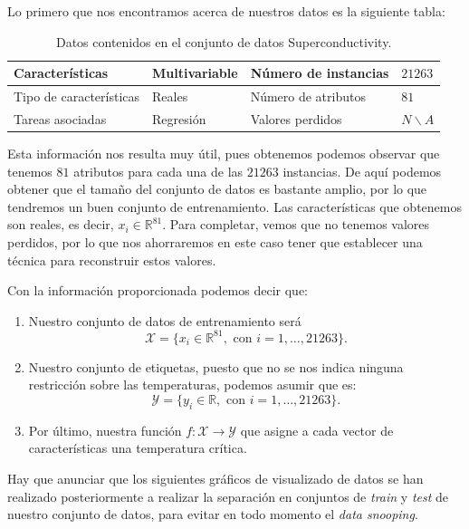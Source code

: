 \documentclass[a4paper, 20pt]{article}
\newcommand{\R}{\mathbb R}
\begin{document}
Lo primero que nos encontramos acerca de nuestros datos es la siguiente tabla:
\begin{table}[h]
  \centering
  \begin{tabular}{|l|l|l|l|}
    \hline
    Características         & Multivariable & Número de instancias & $21263$ \\ \hline
    Tipo de características & Reales        & Número de atributos  & $81$    \\ \hline
    Tareas asociadas        & Regresión     & Valores perdidos     & $N\backslash A$   \\ \hline
  \end{tabular}
  \caption{Datos contenidos en el conjunto de datos Superconductivity.}
\end{table}


Esta información nos resulta muy útil, pues obtenemos podemos observar que tenemos $81$ atributos para cada una de las $21263$ instancias. De aquí podemos obtener que el tamaño del conjunto de datos es bastante amplio, por lo que tendremos un buen conjunto de entrenamiento. Las características que obtenemos son reales, es decir, $x_i \in \mathbb R^{81}$. Para completar, vemos que no tenemos valores perdidos, por lo que nos ahorraremos en este caso tener que establecer una técnica para reconstruir estos valores.

Con la información proporcionada podemos decir que:

\begin{enumerate}
\item Nuestro conjunto de datos de entrenamiento será
  $$\mathcal X = \{ x_i \in \R^{81}, \text{ con } i = 1, \dots , 21263 \}.$$

\item Nuestro conjunto de etiquetas, puesto que no se nos indica ninguna restricción sobre las temperaturas, podemos asumir que es:
  $$
  \mathcal Y = \{ y_i \in \R, \text { con } i = 1,\dots,21263\}.
  $$

\item Por último, nuestra función $f : \mathcal X \to \mathcal Y$ que asigne a cada vector de características una temperatura crítica.
  
\end{enumerate}

Hay que anunciar que los siguientes gráficos de visualizado de datos se han realizado posteriormente a realizar la separación en conjuntos de \emph{train} y \emph{test} de nuestro conjunto de datos, para evitar en todo momento el \emph{data snooping}.\\
\end{document}
